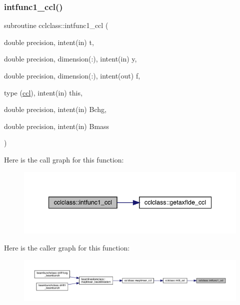 \mbox{\label{namespacecclclass_a09adb3ba980646f12eb22fddbd4c962d}} 
\subsubsection{\texorpdfstring{intfunc1\_ccl()}{intfunc1\_ccl()}}
{\footnotesize\ttfamily subroutine cclclass\+::intfunc1\+\_\+ccl (\begin{DoxyParamCaption}\item[{double precision, intent(in)}]{t,  }\item[{double precision, dimension(\+:), intent(in)}]{y,  }\item[{double precision, dimension(\+:), intent(out)}]{f,  }\item[{type (\mbox{\hyperlink{namespacecclclass_structcclclass_1_1ccl}{ccl}}), intent(in)}]{this,  }\item[{double precision, intent(in)}]{Bchg,  }\item[{double precision, intent(in)}]{Bmass }\end{DoxyParamCaption})}

Here is the call graph for this function\+:\nopagebreak
\begin{figure}[H]
\begin{center}
\leavevmode
\includegraphics[width=340pt]{namespacecclclass_a09adb3ba980646f12eb22fddbd4c962d_cgraph}
\end{center}
\end{figure}
Here is the caller graph for this function\+:\nopagebreak
\begin{figure}[H]
\begin{center}
\leavevmode
\includegraphics[width=350pt]{namespacecclclass_a09adb3ba980646f12eb22fddbd4c962d_icgraph}
\end{center}
\end{figure}
\mbox{\label{namespacecclclass_a2efbf5186624893a0f213ca40968c198}} 
